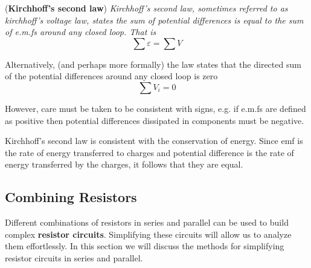 \begin{theorem}{(\textbf{Kirchhoff's second law})}
\textit{Kirchhoff's second law, sometimes referred to as kirchhoff's voltage law, states the sum of potential differences is equal to the sum of e.m.fs around any closed loop. That is}
\begin{equation}
    \sum \varepsilon = \sum V
\end{equation}
\end{theorem}

Alternatively, (and perhaps more formally) the law states that the directed sum of the potential differences around any closed loop is zero
\begin{equation}
    \sum V_i = 0
\end{equation}

However, care must be taken to be consistent with signs, e.g. if e.m.fs are defined as positive then potential differences dissipated in components must be negative.

Kirchhoff's second law is consistent with the conservation of energy. Since emf is the rate of energy transferred to charges and potential difference is the rate of energy transferred by the charges, it follows that they are equal. 

\subsection{Combining Resistors}

Different combinations of resistors in series and parallel can be used to build complex \textbf{resistor circuits}. Simplifying these circuits will allow us to analyze them effortlessly. In this section we will discuss the methods for simplifying resistor circuits in series and parallel.

